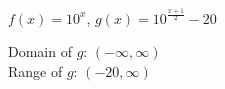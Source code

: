 {$f(x) = 10^{x}$, $g(x) = 10^{\frac{x+1}{2}} - 20$  }
{Domain of $g$:  $(-\infty, \infty)$\\
 Range of $g$:  $(-20, \infty)$\\
 
\begin{center}
\end{center}}

